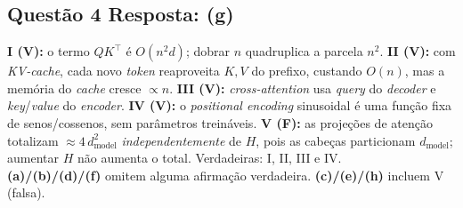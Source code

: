 \documentclass[11pt,a4paper]{article}
\begin{document}
\subsection*{Questão 4 \textemdash{} Resposta: (g)}
\textbf{I (V):} o termo $QK^\top$ é $O(n^2 d)$; dobrar $n$ quadruplica a parcela $n^2$.
\textbf{II (V):} com \textit{KV-cache}, cada novo \textit{token} reaproveita $K, V$ do prefixo, custando $O(n)$, mas a memória do \textit{cache} cresce $\propto n$.
\textbf{III (V):} \textit{cross-attention} usa \textit{query} do \textit{decoder} e \textit{key}/\textit{value} do \textit{encoder}.
\textbf{IV (V):} o \textit{positional encoding} sinusoidal é uma função fixa de senos/cossenos, sem parâmetros treináveis.
\textbf{V (F):} as projeções de atenção totalizam $\approx 4\,d_{\text{model}}^2$ \emph{independentemente} de $H$, pois as cabeças particionam $d_{\text{model}}$; aumentar $H$ não aumenta o total.
Verdadeiras: I, II, III e IV.\\
\textbf{(a)/(b)/(d)/(f)} omitem alguma afirmação verdadeira.
\textbf{(c)/(e)/(h)} incluem V (falsa).
\end{document}
